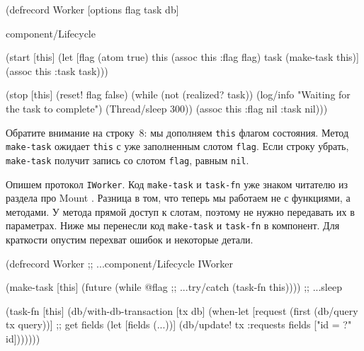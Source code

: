 \else

\begin{english}
  \begin{clojure/lines}
(defrecord Worker
  [options flag task db]

  component/Lifecycle

  (start [this]
    (let [flag (atom true)
          this (assoc this :flag flag)
          task (make-task this)]
      (assoc this :task task)))

  (stop [this]
    (reset! flag false)
    (while (not (realized? task))
      (log/info "Waiting for the task to complete")
      (Thread/sleep 300))
    (assoc this :flag nil :task nil)))
  \end{clojure/lines}
\end{english}

\fi

\fi

Обратите внимание на строку~8: мы дополняем \verb|this| флагом состояния. Метод
\verb|make-task| ожидает \verb|this| с уже заполненным слотом \verb|flag|. Если
строку убрать, \verb|make-task| получит запись со слотом \verb|flag|, равным
\verb|nil|.


Опишем протокол \verb|IWorker|. Код \verb|make-task| и \verb|task-fn| уже знаком
читателю из раздела про Mount . Разница в том, что теперь мы
работаем не с функциями, а методами. У метода прямой доступ к слотам, поэтому не
нужно передавать их в параметрах. Ниже мы перенесли код \verb|make-task| и
\verb|task-fn| в компонент. Для краткости опустим перехват ошибок и некоторые
детали.

\ifnarrow

\begin{english}
  \begin{clojure}
(defrecord Worker
  ;; ...component/Lifecycle
  IWorker

  (make-task [this]
    (future
      (while @flag    ;; ...try/catch
        (task-fn this)))) ;; ...sleep

  (task-fn [this]
    (db/with-db-transaction [tx db]
      (when-let [request
                  (first
                    (db/query tx query))]
        ;; get fields
        (let [fields (...))]
          (db/update! tx :requests
            fields ["id = ?" id]))))))
  \end{clojure}
\end{english}

\else

